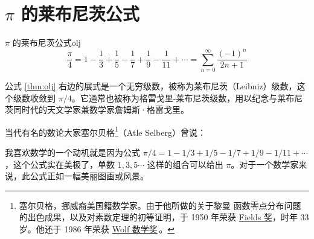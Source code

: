 \documentclass[12pt, cn]{elegantart}
\begin{document}
\begin{center}
\end{center}


\section{$\pi$ 的莱布尼茨公式}

\begin{theorem}{$\pi$ 的莱布尼茨公式}{olj}
	\begin{equation}
	\frac{\pi}{4}=1-\frac{1}{3}+\frac{1}{5}-\frac{1}{7}+\frac{1}{9}-\frac{1}{11}+\cdots =\sum_{n=0}^{\infty} \frac{(-1)^{n}}{2 n+1}
	\end{equation}
   \vspace{-12pt}
\end{theorem}

公式 \eqref{thm:olj} 右边的展式是一个无穷级数，被称为莱布尼茨（Leibniz）级数，这个级数收敛到 $\pi/4$。它通常也被称为格雷戈里-莱布尼茨级数，用以纪念与莱布尼茨同时代的天文学家兼数学家詹姆斯·格雷戈里。

当代有名的数论大家塞尔贝格\footnote{塞尔贝格，挪威裔美国籍数学家。由于他所做的关于黎曼 \textzeta 函数零点分布问题的出色成果，以及对素数定理的初等证明，于 1950 年荣获 \href{https://www.mathunion.org/imu-awards/fields-medal}{Fields 奖}，时年 33 岁。他还于 1986 年荣获 \href{[Wolf 数学奖](http://www.wolffund.org.il/index.php?dir=site&page=winners&cs=221}{Wolf 数学奖}\,。}（Atle Selberg）曾说：
\vspace{8pt}

\begin{tcolorbox}[saying]
	我喜欢数学的一个动机就是因为公式 $\pi/4=1-1/3+1/5-1/7+1/9-1/11+\cdots$，这个公式实在美极了，单数 $1,3,5\cdots$ 这样的组合可以给出 $\pi$。对于一个数学家来说，此公式正如一幅美丽图画或风景。
\end{tcolorbox}
\end{document}
